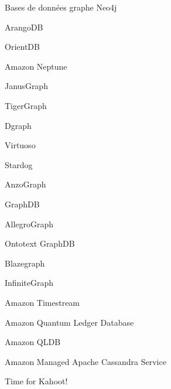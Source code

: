 \begin{frame}{Bases de données graphe}
    Neo4j

    ArangoDB

    OrientDB

    Amazon Neptune

    JanusGraph

    TigerGraph

    Dgraph

    Virtuoso

    Stardog

    AnzoGraph

    GraphDB

    AllegroGraph

    Ontotext GraphDB

    Blazegraph

    InfiniteGraph

    Amazon Timestream

    Amazon Quantum Ledger Database

    Amazon QLDB

    Amazon Managed Apache Cassandra Service

\end{frame}

\begin{frame}[standout]
    
Time for Kahoot!

\end{frame}